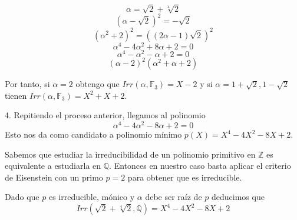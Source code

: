 $$\alpha = \sqrt{2}+\sqrt[4]{2}$$ $$(\alpha - \sqrt{2})^2 = -\sqrt{2}$$ $$(\alpha^2+2)^2 = ((2 \alpha - 1) \sqrt{2})^2$$ $$\alpha^4 - 4 \alpha^2 + 8 \alpha + 2 = 0$$ $$\alpha^4 - \alpha^2 - \alpha + 2 = 0$$ $$(\alpha-2)^2(\alpha^2+\alpha+2)$$

Por tanto, si $\alpha = 2$ obtengo que $Irr(\alpha,\mathbb{F}_3) = X-2$ y si $\alpha = 1+\sqrt{2},1-\sqrt{2}$ tienen $Irr(\alpha,\mathbb{F}_3) = X^2+X+2$.

4. Repitiendo el proceso anterior,  llegamos al polinomio $$\alpha^4 - 4 \alpha^2 - 8 \alpha + 2 = 0$$ Esto nos da como candidato a polinomio mínimo $p(X) = X^4 - 4X^2 - 8 X + 2$. 

Sabemos que estudiar la irreducibilidad  de un polinomio primitivo en $\mathbb{Z}$ es equivalente a estudiarla en $\mathbb{Q}$. Entonces en nuestro caso basta aplicar el criterio de Eisenstein con un primo $p = 2$ para obtener que es irreducible. 

Dado que $p$ es irreducible, mónico y $\alpha$ debe ser raíz de $p$ deducimos que $$Irr(\sqrt{2}+\sqrt[4]{2},\mathbb{Q}) = X^4 - 4X^2 - 8 X + 2$$
